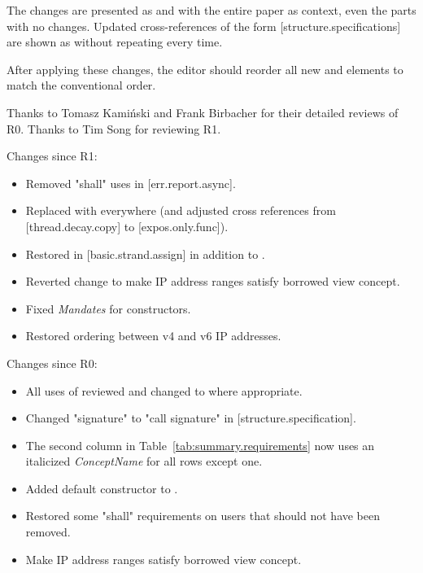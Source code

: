 The changes are presented as  and 
with the entire paper as context, even the parts with no changes.
Updated cross-references of the form \CppXIV{}[structure.specifications] 
are shown as  without repeating
 every time.

After applying these changes, the editor should reorder all new
\constraints and \mandates elements to match the conventional order.

\vspace{2.5cm}

Thanks to Tomasz Kamiński and Frank Birbacher for their detailed reviews of R0.
Thanks to Tim Song for reviewing R1.

Changes since R1:
\begin{itemize}
\item Removed "shall" uses in [err.report.async].
\item Replaced  with  everywhere
  (and adjusted cross references from [thread.decay.copy] to [expos.only.func]).
\item Restored \expects in [basic.strand.assign] in addition to \constraints{}.
\item Reverted change to make IP address ranges satisfy borrowed view concept.
\item Fixed \textit{Mandates} for  constructors.
\item Restored ordering between v4 and v6 IP addresses.
\end{itemize}

Changes since R0:
\begin{itemize}
\item All uses of  reviewed and changed to
   where appropriate.
\item Changed "signature" to "call signature" in [structure.specification].
\item The second column in Table~\ref{tab:summary.requirements} now uses
  an italicized \textit{ConceptName} for all rows except one.
\item Added  default constructor to .
\item Restored some "shall" requirements on users that should not have been removed.
\item Make IP address ranges satisfy borrowed view concept.
\end{itemize}

